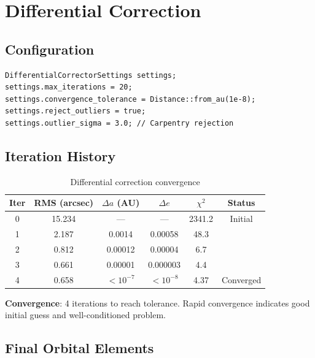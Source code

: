 \section{Differential Correction}

\subsection{Configuration}

\begin{lstlisting}[style=cpp, caption={Differential correction settings}]
DifferentialCorrectorSettings settings;
settings.max_iterations = 20;
settings.convergence_tolerance = Distance::from_au(1e-8);
settings.reject_outliers = true;
settings.outlier_sigma = 3.0; // Carpentry rejection
\end{lstlisting}

\subsection{Iteration History}

\begin{table}[htbp]
\centering
\caption{Differential correction convergence}
\begin{tabular}{cccccc}
\hline
\textbf{Iter} & \textbf{RMS (arcsec)} & \textbf{$\Delta a$ (AU)} & \textbf{$\Delta e$} & \textbf{$\chi^2$} & \textbf{Status} \\
\hline
0 & 15.234 & — & — & 2341.2 & Initial \\
1 & 2.187 & 0.0014 & 0.00058 & 48.3 & \\
2 & 0.812 & 0.00012 & 0.00004 & 6.7 & \\
3 & 0.661 & 0.00001 & 0.000003 & 4.4 & \\
4 & 0.658 & $< 10^{-7}$ & $< 10^{-8}$ & 4.37 & Converged \\
\hline
\end{tabular}
\end{table}

\textbf{Convergence}: 4 iterations to reach tolerance. Rapid convergence indicates good initial guess and well-conditioned problem.

\subsection{Final Orbital Elements}

